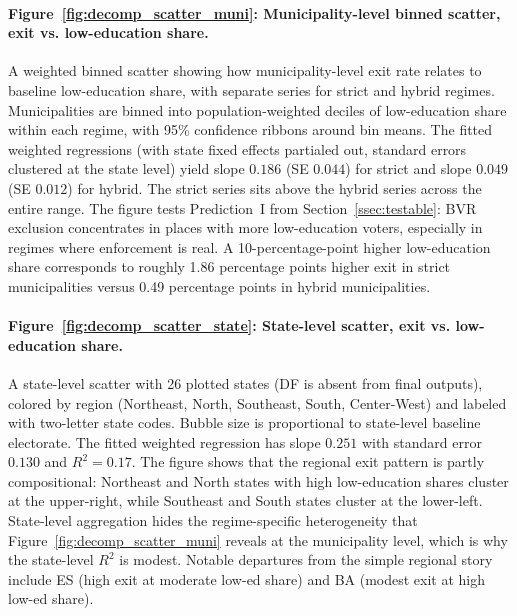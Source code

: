 \paragraph{Figure~\ref{fig:decomp_scatter_muni}: Municipality-level binned scatter, exit vs. low-education share.} A weighted binned scatter showing how municipality-level exit rate relates to baseline low-education share, with separate series for strict and hybrid regimes. Municipalities are binned into population-weighted deciles of low-education share within each regime, with 95\% confidence ribbons around bin means. The fitted weighted regressions (with state fixed effects partialed out, standard errors clustered at the state level) yield slope $0.186$ (SE $0.044$) for strict and slope $0.049$ (SE $0.012$) for hybrid. The strict series sits above the hybrid series across the entire range. The figure tests Prediction~I from Section~\ref{ssec:testable}: BVR exclusion concentrates in places with more low-education voters, especially in regimes where enforcement is real. A 10-percentage-point higher low-education share corresponds to roughly 1.86 percentage points higher exit in strict municipalities versus 0.49 percentage points in hybrid municipalities.

\paragraph{Figure~\ref{fig:decomp_scatter_state}: State-level scatter, exit vs. low-education share.} A state-level scatter with 26 plotted states (DF is absent from final outputs), colored by region (Northeast, North, Southeast, South, Center-West) and labeled with two-letter state codes. Bubble size is proportional to state-level baseline electorate. The fitted weighted regression has slope $0.251$ with standard error $0.130$ and $R^2 = 0.17$. The figure shows that the regional exit pattern is partly compositional: Northeast and North states with high low-education shares cluster at the upper-right, while Southeast and South states cluster at the lower-left. State-level aggregation hides the regime-specific heterogeneity that Figure~\ref{fig:decomp_scatter_muni} reveals at the municipality level, which is why the state-level $R^2$ is modest. Notable departures from the simple regional story include ES (high exit at moderate low-ed share) and BA (modest exit at high low-ed share).


